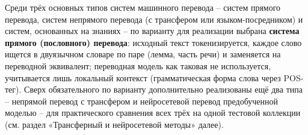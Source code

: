 Среди трёх основных типов систем машинного перевода -- систем прямого
перевода, систем непрямого перевода (с трансфером или
языком-посредником) и систем, основанных на знаниях -- по варианту для
реализации выбрана \textbf{система прямого (пословного) перевода}:
исходный текст токенизируется, каждое слово ищется в двуязычном словаре
по паре (лемма, часть речи) и заменяется на переводной эквивалент;
переводная модель как таковая не используется, учитывается лишь
локальный контекст (грамматическая форма слова через POS-тег). Сверх
обязательного по варианту дополнительно реализованы ещё два типа --
непрямой перевод с трансфером и нейросетевой перевод предобученной
моделью -- для практического сравнения всех трёх на одной тестовой
коллекции (см. раздел «Трансферный и нейросетевой методы» далее).
